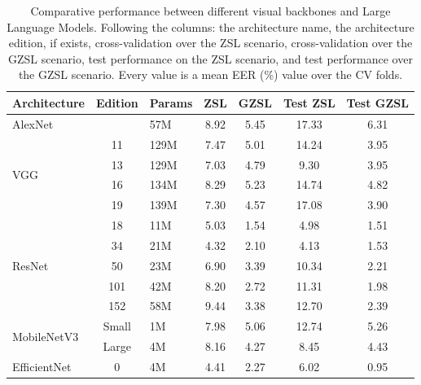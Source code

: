 \begin{table}[ht]
\caption{Comparative performance between different visual backbones and Large Language Models. Following the columns: the architecture name, the architecture edition, if exists, cross-validation over the \gls{ZSL} scenario, cross-validation over the \gls{GZSL} scenario, test performance on the \gls{ZSL} scenario, and test performance over the \gls{GZSL} scenario. Every value is a mean EER (\%) value over the \gls{CV} folds.}
\label{tab:res}
\centering
\setlength{\tabcolsep}{6pt}
\begin{tabular}{lclcccc}
\toprule
Architecture                            & Edition & Params & \gls{ZSL}    & \gls{GZSL}    & Test \gls{ZSL} & Test \gls{GZSL} \\
\midrule
AlexNet                                 &         &  57M   & 8.92   & 5.45    & 17.33    & 6.31      \\ \midrule
\multirow{4}{*}{VGG}                    & 11      &  129M  & 7.47   & 5.01    & 14.24    & 3.95      \\
                                        & 13      &  129M  & 7.03   & 4.79    & 9.30     & 3.95      \\
                                        & 16      &  134M  & 8.29   & 5.23    & 14.74    & 4.82      \\
                                        & 19      &  139M  & 7.30   & 4.57    & 17.08    & 3.90      \\ \midrule
\multirow{5}{*}{ResNet}                 & 18      &  11M   & 5.03   & 1.54    & 4.98     & 1.51      \\
                                        & 34      &  21M   & 4.32   & 2.10    & 4.13     & 1.53      \\
                                        & 50      &  23M   & 6.90   & 3.39    & 10.34    & 2.21      \\
                                        & 101     &  42M   & 8.20   & 2.72    & 11.31    & 1.98      \\
                                        & 152     &  58M   & 9.44   & 3.38    & 12.70    & 2.39      \\ \midrule
\multirow{2}{*}{MobileNetV3}            & Small   &  1M    & 7.98   & 5.06    & 12.74    & 5.26      \\
                                        & Large   &  4M    & 8.16   & 4.27    & 8.45     & 4.43      \\ \midrule
\multirow{4}{*}{EfficientNet}           & 0       &  4M    & 4.41   & 2.27    & 6.02     & 0.95      \\

\end{tabular}
\end{table}
